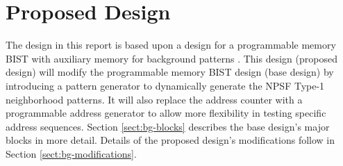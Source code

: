 \chapter{Proposed Design}
\label{chap:design}
The design in this report is based upon a design for a programmable memory BIST with auxiliary memory for background patterns \cite{1584083}.  This design (proposed design) will modify the programmable memory BIST design (base design) by introducing a pattern generator to dynamically generate the NPSF Type-1 neighborhood patterns.  It will also replace the address counter with a programmable address generator to allow more flexibility in testing specific address sequences.  Section \ref{sect:bg-blocks} describes the base design's major blocks in more detail.  Details of the proposed design's modifications follow in Section \ref{sect:bg-modifications}.





